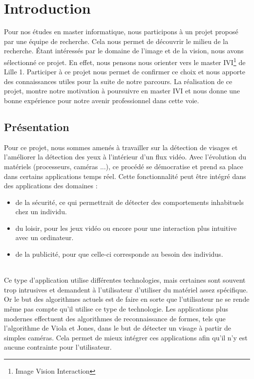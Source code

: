 \section{Introduction}

Pour nos études en master informatique, nous participons à un projet proposé par une 
équipe de recherche. Cela nous permet de découvrir le milieu de la recherche. 
Étant intéressés par le domaine de l'image et de la vision, nous avons sélectionné ce projet. 
En effet, nous pensons nous orienter vers le master IVI\footnote{Image Vision Interaction} de 
Lille 1. Participer à ce projet nous permet de confirmer ce choix et nous apporte des 
connaissances utiles pour la suite de notre parcours. La réalisation de ce projet, montre 
notre motivation à poursuivre en master IVI et nous donne une bonne expérience pour notre 
avenir professionnel dans cette voie.\\

\subsection{Présentation}
Pour ce projet, nous sommes amenés à travailler sur la détection de visages et l'améliorer la détection 
des yeux à l'intérieur d'un flux vidéo.
Avec l'évolution du matériels (processeurs, caméras ...), ce procédé se démocratise et prend sa place 
dans certains applications temps réel. Cette fonctionnalité peut être intégré dans des applications des domaines : 
\begin{itemize}
 \item de la sécurité, ce qui permettrait de détecter des comportements inhabituels chez un individu.
 \item du loisir, pour les jeux vidéo ou encore pour une interaction plus intuitive avec un ordinateur.
 \item de la publicité, pour que celle-ci corresponde au besoin des individus. 
\end{itemize}
\ \\
Ce type d'application utilise différentes technologies, mais certaines sont souvent trop intrusives 
et demandent à l'utilisateur d'utiliser du matériel assez spécifique. Or le but des algorithmes actuels
est de faire en sorte que l'utilisateur ne se rende même pas compte qu'il utilise ce type de technologie. Les applications plus 
modernes effectuent des algorithmes de reconnaissance de formes, tels que l'algorithme de Viola et Jones, dans 
le but de détecter un visage à partir de simples caméras. Cela permet de mieux intégrer ces applications 
afin qu'il n'y est aucune contrainte pour l'utilisateur.\\

